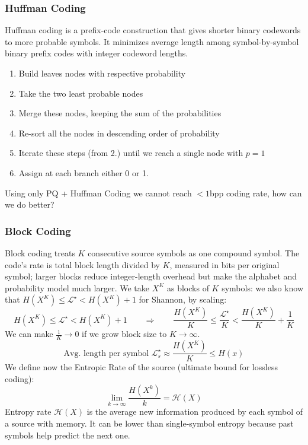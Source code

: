 \subsubsection{Huffman Coding}
Huffman coding is a prefix-code construction that gives shorter binary codewords to more probable symbols. It minimizes average length among symbol-by-symbol binary prefix codes with integer codeword lengths.
\begin{enumerate}
    \item Build leaves nodes with respective probability
    \item Take the two least probable nodes
    \item Merge these nodes, keeping the sum of the probabilities
    \item Re-sort all the nodes in descending order of probability
    \item Iterate these steps (from 2.) until we reach a single node with $p=1$
    \item Assign at each branch either 0 or 1.
\end{enumerate}
Using only PQ + Huffman Coding we cannot reach $< 1$bpp coding rate, how can we do better?
\subsubsection{Block Coding}
Block coding treats $K$ consecutive source symbols as one compound symbol. The code's rate is total block length divided by $K$, measured in bits per original symbol; larger blocks reduce integer-length overhead but make the alphabet and probability model much larger.
We take $X^K$ as blocks of $K$ symbols: we also know that $H(X^K) \leq \mathcal{L}^\star < H(X^K) + 1$ for Shannon, by scaling:
$$H(X^K) \leq \mathcal{L}^\star < H(X^K) + 1 \qquad\Longrightarrow \qquad \frac{H(X^K)}{K} \leq \frac{\mathcal{L}^\star}{K} < \frac{H(X^K)}{K} + \frac{1}{K}$$
We can make $\frac{1}{K} \to 0$ if we grow block size to $K \to \infty$.
$$\text{Avg. length per symbol }\mathcal{L}_s^\star \approx \frac{H(X^K)}{K}\leq H(x)$$
We define now the Entropic Rate of the source (ultimate bound for lossless coding):
$$\lim_{k\to\infty}\frac{H(X^k)}{k} = \mathcal{H}(X)$$
Entropy rate $\mathcal{H}(X)$ is the average new information produced by each symbol of a source with memory. It can be lower than single-symbol entropy because past symbols help predict the next one.
